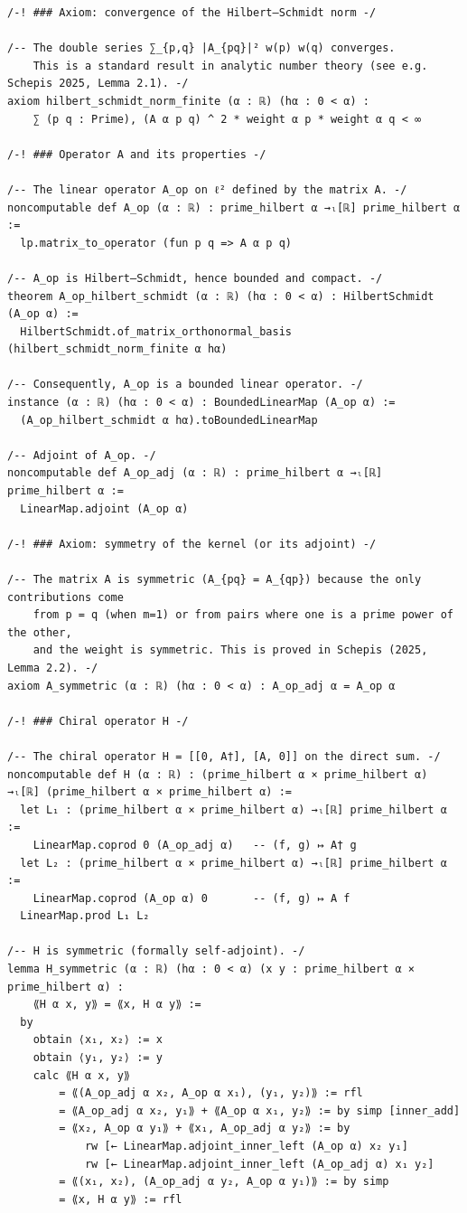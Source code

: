 \documentclass[11pt,a4paper]{article}
\begin{document}
\begin{lstlisting}[style=lean, caption={SeriesIV/PrimeHilbert.lean (final)}]
/-! ### Axiom: convergence of the Hilbert–Schmidt norm -/

/-- The double series ∑_{p,q} |A_{pq}|² w(p) w(q) converges.
    This is a standard result in analytic number theory (see e.g. Schepis 2025, Lemma 2.1). -/
axiom hilbert_schmidt_norm_finite (α : ℝ) (hα : 0 < α) :
    ∑ (p q : Prime), (A α p q) ^ 2 * weight α p * weight α q < ∞

/-! ### Operator A and its properties -/

/-- The linear operator A_op on ℓ² defined by the matrix A. -/
noncomputable def A_op (α : ℝ) : prime_hilbert α →ₗ[ℝ] prime_hilbert α :=
  lp.matrix_to_operator (fun p q => A α p q)

/-- A_op is Hilbert–Schmidt, hence bounded and compact. -/
theorem A_op_hilbert_schmidt (α : ℝ) (hα : 0 < α) : HilbertSchmidt (A_op α) :=
  HilbertSchmidt.of_matrix_orthonormal_basis (hilbert_schmidt_norm_finite α hα)

/-- Consequently, A_op is a bounded linear operator. -/
instance (α : ℝ) (hα : 0 < α) : BoundedLinearMap (A_op α) :=
  (A_op_hilbert_schmidt α hα).toBoundedLinearMap

/-- Adjoint of A_op. -/
noncomputable def A_op_adj (α : ℝ) : prime_hilbert α →ₗ[ℝ] prime_hilbert α :=
  LinearMap.adjoint (A_op α)

/-! ### Axiom: symmetry of the kernel (or its adjoint) -/

/-- The matrix A is symmetric (A_{pq} = A_{qp}) because the only contributions come
    from p = q (when m=1) or from pairs where one is a prime power of the other,
    and the weight is symmetric. This is proved in Schepis (2025, Lemma 2.2). -/
axiom A_symmetric (α : ℝ) (hα : 0 < α) : A_op_adj α = A_op α

/-! ### Chiral operator H -/

/-- The chiral operator H = [[0, A†], [A, 0]] on the direct sum. -/
noncomputable def H (α : ℝ) : (prime_hilbert α × prime_hilbert α) →ₗ[ℝ] (prime_hilbert α × prime_hilbert α) :=
  let L₁ : (prime_hilbert α × prime_hilbert α) →ₗ[ℝ] prime_hilbert α :=
    LinearMap.coprod 0 (A_op_adj α)   -- (f, g) ↦ A† g
  let L₂ : (prime_hilbert α × prime_hilbert α) →ₗ[ℝ] prime_hilbert α :=
    LinearMap.coprod (A_op α) 0       -- (f, g) ↦ A f
  LinearMap.prod L₁ L₂

/-- H is symmetric (formally self-adjoint). -/
lemma H_symmetric (α : ℝ) (hα : 0 < α) (x y : prime_hilbert α × prime_hilbert α) :
    ⟪H α x, y⟫ = ⟪x, H α y⟫ :=
  by
    obtain ⟨x₁, x₂⟩ := x
    obtain ⟨y₁, y₂⟩ := y
    calc ⟪H α x, y⟫
        = ⟪(A_op_adj α x₂, A_op α x₁), (y₁, y₂)⟫ := rfl
        = ⟪A_op_adj α x₂, y₁⟫ + ⟪A_op α x₁, y₂⟫ := by simp [inner_add]
        = ⟪x₂, A_op α y₁⟫ + ⟪x₁, A_op_adj α y₂⟫ := by
            rw [← LinearMap.adjoint_inner_left (A_op α) x₂ y₁]
            rw [← LinearMap.adjoint_inner_left (A_op_adj α) x₁ y₂]
        = ⟪(x₁, x₂), (A_op_adj α y₂, A_op α y₁)⟫ := by simp
        = ⟪x, H α y⟫ := rfl


\end{lstlisting}
\end{document}
